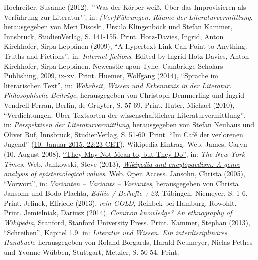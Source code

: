\documentclass[fontsize=12pt]{scrartcl}
\begin{document}
{{{{\begin{thebibliography}
	Hochreiter, Susanne (2012), "'Was der K\"orper wei{\ss}. \"Uber das Improvisieren als \flq Verf\"uh\-rung\frq \,\,zur Li\-te\-ra\-tur"', in: \textit{(Ver)F\"uh\-rungen. R\"aume der Li\-te\-ra\-tur\-ver\-mitt\-lung}, he\-rausgegeben von Meri Disoski, Ursula Klingenb\"ock und Stefan Kammer, Innsbruck, StudienVerlag, S. 141-155. Print.
	Hotz-Davies, Ingrid, Anton Kirchhofer, Sirpa Lepp\"anen (2009), "`\flq A Hypertext Link Can Point to Anything\frq. Truths and Fictions"', in: \textit{Internet fictions}. Edited by Ingrid Hotz-Davies, Anton Kirchhofer, Sirpa Lepp\"anen. Newcastle upon Tyne: Cambridge Scholars Publishing, 2009, ix-xv. Print.
	Huemer, Wolfgang (2014), "`Sprache im literarischen Text"', in: \textit{Wahrheit, Wissen und Erkenntnis in der Li\-te\-ra\-tur. Philosophische Beitr\"age}, he\-rausgegeben von Christoph Demmerling und \'{I}ngrid Vendrell Ferran, Berlin, de Gruyter, S. 57-69. Print.
	Huter, Michael (2010), "`Verdichtungen. \"Uber Textsorten der wissenschaftlichen Li\-te\-ra\-tur\-ver\-mitt\-lung"', in: \textit{Perspektiven der Li\-te\-ra\-tur\-ver\-mitt\-lung}, he\-rausgegeben von Stefan Neuhaus und Oliver Ruf, Innsbruck, StudienVerlag, S. 51-60. Print.
	"`Im Caf\'{e} der verlorenen Jugend"' (\href{https://de.wikipedia.org/w/index.php?title=Im_Caf\%C3\%A9_der_verlorenen_Jugend&oldid=137646716}{10. Januar 2015, 22:23 CET}), Wi\-ki\-pe\-dia-Ein\-trag. Web.
	James, Caryn (10. August 2008), \href{http://www.nytimes.com/2008/08/10/books/review/James-t.html}{"`They May Not Mean to, but They Do"'}, in: \textit{The New York Times}. Web.
	Jankowski, Steve (2013), \href{http://pierrelevyblog.files.wordpress.com/2013/05/stevejankowski_thesis_v18.pdf}{\textit{Wi\-ki\-pe\-dia and encylopaedism: A genre ana\-lysis of epistemological values}}. Web. Open Access.
	Jansohn, Christa (2005), "`Vorwort"', in: \textit{Varianten -- Variants -- Variantes}, he\-\-raus\-ge\-ge\-ben von Christa Jansohn und Bodo Plachta, \textit{Editio / Beihefte ; 22}, T\"ubingen, Niemeyer, S. 1-6. Print.
	Jelinek, Elfriede (2013), \textit{rein GOLD}, Reinbek bei Hamburg, Rowohlt. Print.
	Jemielniak, Dariusz (2014), \textit{Common know\-ledge? An ethnography of Wi\-ki\-pe\-dia}, Stanford, Stanford University Press. Print.
	Kammer, Stephan (2013), "`Schreiben"', Kapitel 1.9. in: \textit{Li\-te\-ra\-tur und Wissen. Ein interdisziplin\"ares Handbuch}, he\-rausgegeben von Roland Borgards, Harald Neumeyer, Niclas Pethes und Yvonne W\"ubben, Stuttgart, Metzler, S. 50-54. Print.

\end{thebibliography}}}}}
\end{document}

